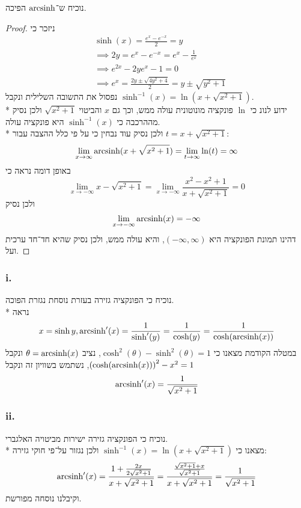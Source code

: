 \Question{}
\Subquestion{}
נוכיח ש־$\operatorname{arcsinh}$ הפיכה.
\begin{proof}
	ניזכר כי
	\begin{align*}
		& \sinh(x) = \frac{e^x - e^{-x}}{2} = y \\
		& \implies 2y = e^x - e^{-x}
		= e^x - \frac{1}{e^x} \\
		& \implies e^{2x} - 2ye^x - 1 = 0 \\
		& \implies e^x = \frac{2y \pm \sqrt{4y^2 + 4}}{2}
		= y \pm \sqrt{y^2 + 1}
	\end{align*}
	נפסול את התשובה השלילית ונקבל $\sinh^{-1}(x) = \ln(x + \sqrt{x^2 + 1})$. \\*
	ידוע לנונ כי $\ln$ פונקציה מונוטונית עולה ממש, וכך גם $x$ והביטוי $\sqrt{x^2 + 1}$ ולכן נסיק מההרכבה כי $\sinh^{-1}(x)$ היא פונקציה עולה. \\*
	ולכן נסיק
	עוד נבחין כי על פי כלל ההצבה עבור $t = x + \sqrt{x^2 + 1}$:
	\[
		\lim_{x \to \infty} \operatorname{arcsinh}(x + \sqrt{x^2 + 1})
		= \lim_{t \to \infty} \ln(t) = \infty
	\]
	באופן דומה נראה כי
	\[
		\lim_{x \to -\infty} x - \sqrt{x^2 + 1} 
		= \lim_{x \to -\infty}  \frac{x^2 - x^2 + 1}{x + \sqrt{x^2 + 1}}
		= 0
	\]
	ולכן נסיק
	\[
		\lim_{x \to -\infty} \operatorname{arcsinh}(x) = -\infty
	\]
	דהינו תמונת הפונקציה היא $(-\infty, \infty)$, והיא עולה ממש, ולכן נסיק שהיא חד־חד ערכית ועל.
\end{proof}

\Subquestion{}
\subsubsection{i.}
נוכיח כי הפונקציה גזירה בעזרת נוסחת נגזרת הפוכה. \\*
נראה
\[
	x = \sinh y,
	\operatorname{arcsinh}'(x)
	= \frac{1}{\sinh'(y)}
	= \frac{1}{\cosh(y)}
	= \frac{1}{\cosh(\operatorname{arcsinh}(x))}
\]
במטלה הקודמת מצאנו כי $\cosh^2(\theta) - \sinh^2(\theta) = 1$, נציב $\theta = \operatorname{arcsinh}(x)$ ונקבל ${(\cosh(\operatorname{arcsinh}(x)))}^2 - x^2 = 1$, נשתמש בשוויון זה ונקבל
\[
	\operatorname{arcsinh}'(x) = \frac{1}{\sqrt{x^2 + 1}}
\]

\subsubsection{ii.}
נוכיח כי הפונקציה גזירה ישירות מביטויה האלגברי. \\*
מצאנו כי $\sinh^{-1}(x) = \ln(x + \sqrt{x^2 + 1})$ ולכן נגזור על־פי חוקי גזירה:
\[
	\operatorname{arcsinh}'(x)
	= \frac{1 + \frac{2x}{2 \sqrt{x^2 + 1}}}{x + \sqrt{x^2 + 1}}
	= \frac{\frac{\sqrt{x^2 + 1} + x}{\sqrt{x^2 + 1}}}{x + \sqrt{x^2 + 1}}
	= \frac{1}{\sqrt{x^2 + 1}}
\]
וקיבלנו נוסחה מפורשת.

